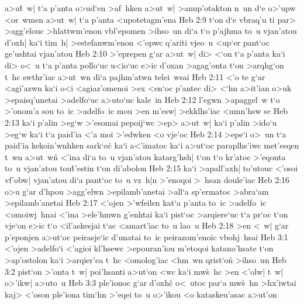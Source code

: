 a>u\r{t}~w|
t`a
p'anta
o>ud`en
>af~hken
a>ut~w|
>anup'otakton
n~un
d`e
o>'upw
<or~wmen
a>ut~w|
t`a
p'anta
<upotetagm'ena\bibvsend
\vs Heb 2:9
t`on
d`e
vbraq'u
ti
par>
>agg'elouc
>hlattwm'enon
vbl'epomen
>ihso~un
di`a
t`o
p'ajhma
to~u
vjan'atou
d'oxh|
ka`i
tim~h|
>estefanwm'enon
<'opwc
q'ariti
vjeo~u
<up`er
pant`oc
ge'ushtai
vjan'atou\bibvsend
\vs Heb 2:10
>'eprepen
g`ar
a>ut~w|
di>
<`on
t`a
p'anta
ka`i
di>
o<~u
t`a
p'anta
pollo`uc
u<io`uc
e>ic
d'oxan
>agag'onta
t`on
>arqhg`on
t~hc
swthr'iac
a>ut~wn
di`a
pajhm'atwn
telei~wsai\bibvsend
\vs Heb 2:11
<'o
te
g`ar
<agi'azwn
ka`i
o<i
<agiaz'omenoi
>ex
<en`oc
p'antec
di>
<`hn
a>it'ian
o>uk
>epaisq'unetai
>adelfo`uc
a>uto`uc
kale~in\bibvsend
\vs Heb 2:12
l'egwn
>apaggel~w
t`o
>'onom'a
sou
to~ic
>adelfo~ic
mou
>en
m'esw|
>ekklhs'iac
<umn'hsw
se\bibvsend
\vs Heb 2:13
ka`i
p'alin
>eg`w
>'esomai
pepoij`wc
>ep>
a>ut~w|
ka`i
p'alin
>ido`u
>eg`w
ka`i
t`a
paid'ia
<'a
moi
>'edwken
<o
vje'oc\bibvsend
\vs Heb 2:14
>epe`i
o>~un
t`a
paid'ia
kekoin'wnhken
sark`oc\r{}
ka`i
a<'imatoc
ka`i
a>ut`oc
paraplhs'iwc
met'esqen
t~wn
a>ut~w\r{n}
<'ina
di`a
to~u
vjan'atou
katarg'hsh|
t`on
t`o
kr'atoc
>'eqonta
to~u
vjan'atou
tou\r{t}'estin
t`on
di'abolon\bibvsend
\vs Heb 2:15
ka`i
>apall'axh|
to'utouc
<'osoi
vf'obw|
vjan'atou
di`a
pant`oc
to~u
vz~h|n
>'enoqoi
>~hsan
doule'iac\bibvsend
\vs Heb 2:16
o>u
g`ar
d'hpou
>agg'elwn
>epilamb'anetai
>all`a
sp'ermatoc
>abra`am
>epilamb'anetai\bibvsend
\vs Heb 2:17
<'ojen
>'wfeilen
kat`a
p'anta
to~ic
>adelfo~ic
<omoiwj~hnai
<'ina
>ele'hmwn
g'enhtai
ka`i
pist`oc
>arqiere`uc
t`a
pr`oc
t`on
vje`on
e>ic
t`o
<il'askesjai
t`ac
<amart'iac
to~u
lao~u\bibvsend
\vs Heb 2:18
>en
<~w|
g`ar
p'eponjen
a>ut`oc
peirasje`ic
d'unatai
to~ic
peirazom'enoic
vbohj~hsai\bibvsend
\vs Heb 3:1
<'ojen
>adelfo`i
<'agioi
kl'hsewc
>epouran'iou
m'etoqoi
katano'hsate
t`on
>ap'ostolon
ka`i
>arqier'ea
t~hc
<omolog'iac
<hm~wn
qrist`on\r{}
>ihso~un\bibvsend
\vs Heb 3:2
pist`on
>'onta
t~w|
poi'hsanti
a>ut`on
<wc
ka`i
mw\r{s}~hc
>en
<'olw|
t~w|
o>'ikw|
a>uto~u\bibvsend
\vs Heb 3:3
ple'ionoc
g`ar
d'oxhc\r{}
o<~utoc
par`a
mw\-\r{s}~hn
>hx'iwtai
kaj>
<'oson
ple'iona
tim`hn
>'eqei
to~u
o>'ikou
<o
kataskeu'asac
a>ut'on\bibvsend
